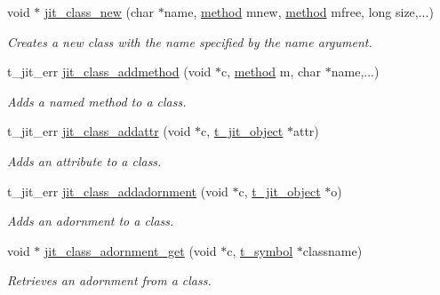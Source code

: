 \begin{DoxyCompactItemize}
\item 
void $\ast$ \hyperlink{group__classmod_ga6c1c213a5c883bf32d0f22678ce2f02b}{jit\_\-class\_\-new} (char $\ast$name, \hyperlink{group__datatypes_gac26ba0a173b50597f5738132e059b42d}{method} mnew, \hyperlink{group__datatypes_gac26ba0a173b50597f5738132e059b42d}{method} mfree, long size,...)
\begin{DoxyCompactList}\small\item\em Creates a new class with the name specified by the name argument. \item\end{DoxyCompactList}\item 
t\_\-jit\_\-err \hyperlink{group__classmod_gab3b84bc08f9f3ee0b29010f653c5ea77}{jit\_\-class\_\-addmethod} (void $\ast$c, \hyperlink{group__datatypes_gac26ba0a173b50597f5738132e059b42d}{method} m, char $\ast$name,...)
\begin{DoxyCompactList}\small\item\em Adds a named method to a class. \item\end{DoxyCompactList}\item 
t\_\-jit\_\-err \hyperlink{group__classmod_ga37e39db544b4d73596da1557e6c7563a}{jit\_\-class\_\-addattr} (void $\ast$c, \hyperlink{structt__object}{t\_\-jit\_\-object} $\ast$attr)
\begin{DoxyCompactList}\small\item\em Adds an attribute to a class. \item\end{DoxyCompactList}\item 
t\_\-jit\_\-err \hyperlink{group__classmod_ga408738c800435bf50d092ce52b223327}{jit\_\-class\_\-addadornment} (void $\ast$c, \hyperlink{structt__object}{t\_\-jit\_\-object} $\ast$o)
\begin{DoxyCompactList}\small\item\em Adds an adornment to a class. \item\end{DoxyCompactList}\item 
void $\ast$ \hyperlink{group__classmod_ga1b040b25876a0905f60683413ce34ae6}{jit\_\-class\_\-adornment\_\-get} (void $\ast$c, \hyperlink{structt__symbol}{t\_\-symbol} $\ast$classname)
\begin{DoxyCompactList}\small\item\em Retrieves an adornment from a class. \item\end{DoxyCompactList}\item 

\end{DoxyCompactItemize}
